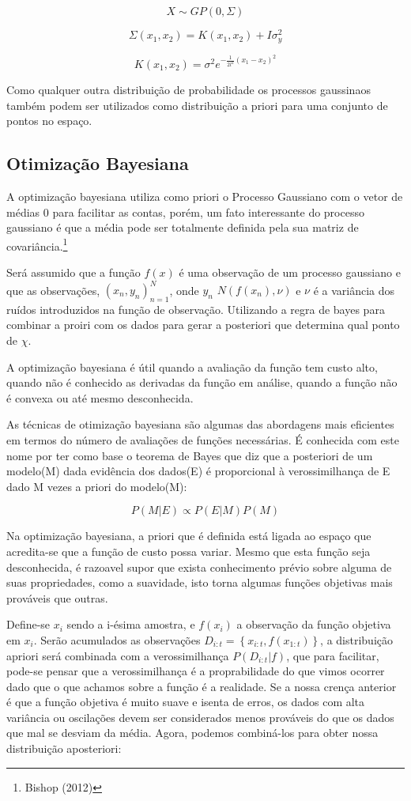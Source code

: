 \documentclass[
	12pt,				%
	a4paper,		%
	oneside,    %
	chapter=TITLE,		   %
	section=TITLE,		   %
	subsection=TITLE,	   %
	subsubsection=TITLE, %
	english,			%
	french,				%
	spanish,			%
	brazil,				%
]{abntex2}
\begin{document}
\[
X \sim GP(0,\Sigma)
\]

\[
\Sigma(x_1,x_2) = K(x_1,x_2) + I\sigma^2_y
\]

\[
K(x_1,x_2) = \sigma^2 e^{-\frac{1}{2l^2}(x_1-x_2)^2}
\]

Como qualquer outra distribuição de probabilidade os processos
gaussinaos também podem ser utilizados como distribuição a priori para
uma conjunto de pontos no espaço.

\hypertarget{otimizauxe7uxe3o-bayesiana}{%
\subsection{Otimização Bayesiana}\label{otimizauxe7uxe3o-bayesiana}}

A optimização bayesiana utiliza como priori o Processo Gaussiano com o
vetor de médias 0 para facilitar as contas, porém, um fato interessante
do processo gaussiano é que a média pode ser totalmente definida pela
sua matriz de covariância.\footnote{Bishop (2012)}

Será assumido que a função \(f(x)\) é uma observação de um processo
gaussiano e que as observações, \((x_n,y_n)_{n=1}^N\), onde
\(y_n \mbox{~} N(f(x_n),\nu)\) e \(\nu\) é a variância dos ruídos
introduzidos na função de observação. Utilizando a regra de bayes para
combinar a proiri com os dados para gerar a posteriori que determina
qual ponto de \(\chi\).

A optimização bayesiana é útil quando a avaliação da função tem custo
alto, quando não é conhecido as derivadas da função em análise, quando a
função não é convexa ou até mesmo desconhecida.

As técnicas de otimização bayesiana são algumas das abordagens mais
eficientes em termos do número de avaliações de funções necessárias. É
conhecida com este nome por ter como base o teorema de Bayes que diz que
a posteriori de um modelo(M) dada evidência dos dados(E) é proporcional
à verossimilhança de E dado M vezes a priori do modelo(M):

\[
P(M|E) \propto P(E|M)P(M)
\]

Na optimização bayesiana, a priori que é definida está ligada ao espaço
que acredita-se que a função de custo possa variar. Mesmo que esta
função seja desconhecida, é razoavel supor que exista conhecimento
prévio sobre alguma de suas propriedades, como a suavidade, isto torna
algumas funções objetivas mais prováveis que outras.

Define-se \(x_i\) sendo a i-ésima amostra, e \(f(x_i)\) a observação da
função objetiva em \(x_i\). Serão acumulados as observações
\(D_{i:t}=\left\{ x_{i:t},f(x_{1:t}) \right\}\), a distribuição apriori
será combinada com a verossimilhança \(P(D_{i:t}|f)\), que para
facilitar, pode-se pensar que a verossimilhança é a proprabilidade do
que vimos ocorrer dado que o que achamos sobre a função é a realidade.
Se a nossa crença anterior é que a função objetiva é muito suave e
isenta de erros, os dados com alta variância ou oscilações devem ser
considerados menos prováveis do que os dados que mal se desviam da
média. Agora, podemos combiná-los para obter nossa distribuição
aposteriori:
\end{document}
